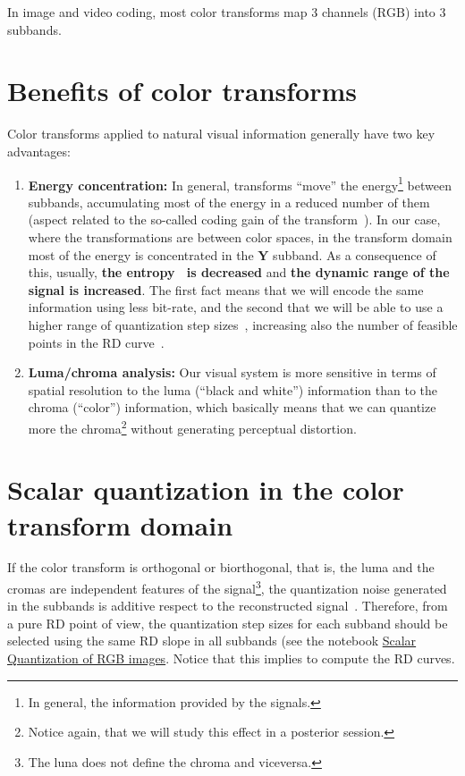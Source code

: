 In image and video coding, most color transforms map 3 channels
($\text{RGB}$) into 3 subbands.

\section{Benefits of color transforms}

Color transforms applied to natural visual information generally have
two key advantages:
\begin{enumerate}
\item \textbf{Energy concentration:} In general, transforms ``move''
  the energy\footnote{In general, the information provided by the
    signals.} between subbands, accumulating most of the energy in a
  reduced number of them (aspect related to the so-called coding gain
  of the transform~\cite{vruiz__transform_coding}). In our case, where
  the transformations are between color spaces, in the transform
  domain most of the energy is concentrated in the $\mathbf{Y}$
  subband. As a consequence of this, usually, \textbf{the
    entropy~\cite{vruiz__information_theory} is decreased} and
  \textbf{the dynamic range of the signal is increased}. The first
  fact means that we will encode the same information using less
  bit-rate, and the second that we will be able to use a higher range
  of quantization step
  sizes~\cite{vruiz__scalar_quantization,sayood2017introduction},
  increasing also the number of feasible points in the RD
  curve~\cite{vruiz__information_theory}.
\item \textbf{Luma/chroma analysis:} Our visual system is more
  sensitive in terms of spatial resolution to the luma
  (``black and white'') information than to the chroma (``color'')
  information, which basically means that we can quantize more the
  chroma\footnote{Notice again, that we will study this effect in a
  posterior session.} without generating perceptual distortion. 
\end{enumerate}

\section{Scalar quantization in the color transform domain}

If the color transform is orthogonal or biorthogonal, that is, the
luma and the cromas are independent features of the
signal\footnote{The luna does not define the chroma and viceversa.},
the quantization noise generated in the subbands is additive respect
to the reconstructed signal~\cite{burger2016digital}. Therefore, from
a pure RD point of view, the quantization step sizes for each subband
should be selected using the same RD slope in all subbands (see the
notebook
\href{https://github.com/vicente-gonzalez-ruiz/color_transforms/blob/main/docs/RGB/RGB_SQ.ipynb}{Scalar
  Quantization of RGB images}. Notice that this implies to compute the
RD curves.

